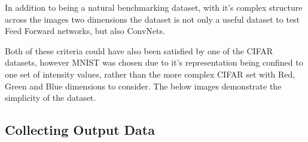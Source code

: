 \documentclass[a4paper,11pt,titlepage]{article}
\begin{document}
	\par 
	In addition to being a natural benchmarking dataset, with it's complex structure across the images two dimensions the dataset is not only a useful dataset to test Feed Forward networks, but also ConvNets.
	\par 
	Both of these criteria could have also been satisfied by one of the CIFAR datasets, however MNIST was chosen due to it's representation being confined to one set of intensity values, rather than the more complex CIFAR set with Red, Green and Blue dimensions to consider. The below images demonstrate the simplicity of the dataset.

	\begin{figure}[H]
    			\centering	
    			\qquad
    			\caption{}%
    			\label{fig:mnist_four}
		\end{figure}

\subsection{Collecting Output Data}
	
\end{document}
